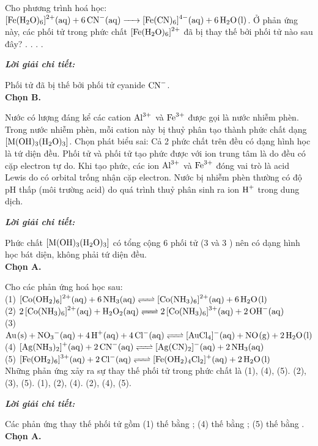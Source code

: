 \documentclass[11pt,a4paper]{article}
\def\loigiai#1{
\par\begingroup\color{blue!80!black}\small
\noindent\textbf{\textit{Lời giải chi tiết:}}\par
#1\par\endgroup}
\begin{document}
\begin{ex}
Cho phương trình hoá học: $\ce{[Fe(H2O)6]^2+(aq) + 6CN-(aq) -> [Fe(CN)6]^4-(aq) + 6H2O(l)}$. Ở phản ứng này, các phối tử  trong phức chất $\ce{[Fe(H2O)6]^2+}$ đã bị thay thế bởi phối tử nào sau đây?
\choice
{.}
{\True {}.}
{.}
{.}
\loigiai{
Phối tử  đã bị thế bởi phối tử cyanide $\ce{CN-}$.\\
\textbf{Chọn B.}}
\end{ex}

\begin{ex}
Nước có lượng đáng kể các cation $\ce{Al^3+}$ và $\ce{Fe^3+}$ được gọi là nước nhiễm phèn. Trong nước nhiễm phèn, mỗi cation này bị thuỷ phân tạo thành phức chất dạng $\ce{[M(OH)3(H2O)3]}$. Chọn phát biểu sai:
\choice
{\True Cả 2 phức chất trên đều có dạng hình học là tứ diện đều.}
{Phối tử  và phối tử  tạo phức được với ion trung tâm là do đều có cặp electron tự do.}
{Khi tạo phức, các ion $\ce{Al^3+}$ và $\ce{Fe^3+}$ đóng vai trò là acid Lewis do có orbital trống nhận cặp electron.}
{Nước bị nhiễm phèn thường có độ pH thấp (môi trường acid) do quá trình thuỷ phân sinh ra ion $\ce{H+}$ trong dung dịch.}
\loigiai{
Phức chất $\ce{[M(OH)3(H2O)3]}$ có tổng cộng 6 phối tử (3 \ce{OH-} và 3 \ce{H2O}) nên có dạng hình học bát diện, không phải tứ diện đều.\\
\textbf{Chọn A.}}
\end{ex}

\begin{ex}
Cho các phản ứng hoá học sau:\\
(1) $\ce{[Co(OH2)6]^2+(aq) + 6NH3(aq) <=> [Co(NH3)6]^2+(aq) + 6H2O(l)}$\\
(2) $\ce{2[Co(NH3)6]^2+(aq) + H2O2(aq) <=> 2[Co(NH3)6]^3+(aq) + 2OH-(aq)}$\\
(3) $\ce{Au(s) + NO3-(aq) + 4H+(aq) + 4Cl-(aq) <=> [AuCl4]-(aq) + NO(g) + 2H2O(l)}$\\
(4) $\ce{[Ag(NH3)2]+(aq) + 2CN-(aq) <=> [Ag(CN)2]-(aq) + 2NH3(aq)}$\\
(5) $\ce{[Fe(OH2)6]^3+(aq) + 2Cl-(aq) <=> [Fe(OH2)4Cl2]+(aq) + 2H2O(l)}$\\
Những phản ứng xảy ra sự thay thế phối tử trong phức chất là
\choice
{\True (1), (4), (5).}
{(2), (3), (5).}
{(1), (2), (4).}
{(2), (4), (5).}
\loigiai{
Các phản ứng thay thế phối tử gồm (1) thế  bằng \ce{NH3}; (4) thế \ce{NH3} bằng \ce{CN-}; (5) thế \ce{H2O} bằng \ce{Cl-}.\\
\textbf{Chọn A.}}
\end{ex}
\end{document}
